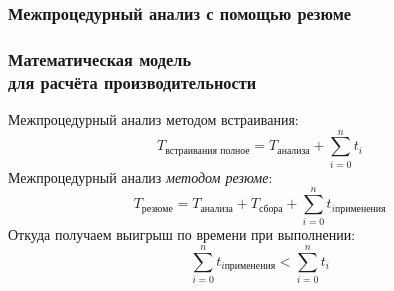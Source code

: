 \documentclass[hyperref={pdfpagelabels=false}]{beamer}
\begin{document}
\begin{frame}
\frametitle{Межпроцедурный анализ с помощью резюме}
\begin{figure}[h]
\end{figure}
\end{frame}
\begin{frame}
\frametitle{Математическая модель\\для расчёта производительности}
Межпроцедурный анализ методом встраивания:
\begin{equation*}
 T_{\text{встраивания полное}} = T_{\text{анализа}} + \sum_{i = 0}^{n} t_i 
\end{equation*}
Межпроцедурный анализ \textit{методом резюме}:
\begin{equation*}
 T_{\text{резюме}} = T_{\text{анализа}} + T_{\text{сбора}} + \sum_{i = 0}^{n} t_{i \text{применения}}
\end{equation*}
Откуда получаем выигрыш по времени при выполнении:
\begin{equation*}
 \sum_{i = 0}^{n} t_{i \text{применения}} <  \sum_{i = 0}^{n} t_i
\end{equation*}


\end{frame}
\end{document}
